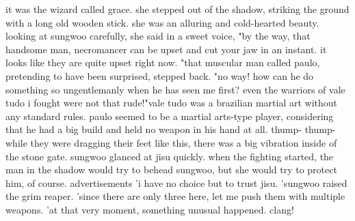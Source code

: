it was the wizard called grace.
 she stepped out of the shadow, striking the ground with a long old wooden stick.
 she was an alluring and cold-hearted beauty.
 looking at sungwoo carefully, she said in a sweet voice, "by the way, that handsome man, necromancer can be upset and cut your jaw in an instant.
 it looks like they are quite upset right now.
"that muscular man called paulo, pretending to have been surprised, stepped back.
"no way! how can he do something so ungentlemanly when he has seen me first? even the warriors of vale tudo i fought were not that rude!"vale tudo was a brazilian martial art without any standard rules.
paulo seemed to be a martial arts-type player, considering that he had a big build and held no weapon in his hand at all.
 thump- thump-while they were dragging their feet like this, there was a big vibration inside of the stone gate.
sungwoo glanced at jisu quickly.
 when the fighting started, the man in the shadow would try to behead sungwoo, but she would try to protect him, of course.
 advertisements    'i have no choice but to trust jisu.
'sungwoo raised the grim reaper.
'since there are only three here, let me push them with multiple weapons.
'at that very moment, something unusual happened.
clang!

 